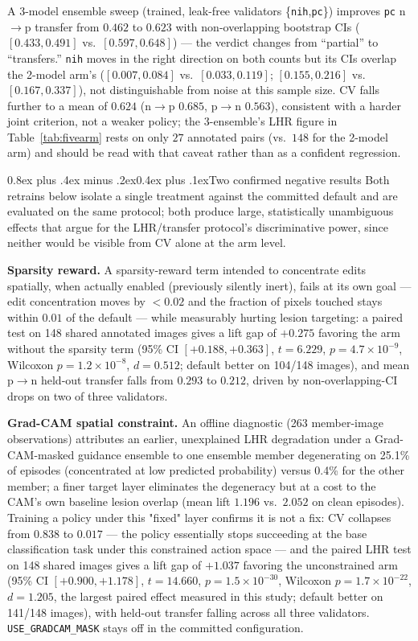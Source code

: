 \documentclass[10pt,twocolumn]{article}
\makeatletter
\renewcommand\subsection{\@startsection{subsection}{2}{\z@}%
  {0.8ex plus .4ex minus .2ex}{0.4ex plus .1ex}{\normalfont\normalsize\bfseries}}
\makeatother
\begin{document}
A 3-model ensemble sweep (trained, leak-free validators
\{\texttt{nih},\texttt{pc}\}) improves \texttt{pc} n$\to$p transfer from
$0.462$ to $0.623$ with non-overlapping bootstrap CIs
($[0.433,0.491]$ vs.\ $[0.597,0.648]$) — the verdict changes from
``partial'' to ``transfers.'' \texttt{nih} moves in the right direction
on both counts but its CIs overlap the 2-model arm's
($[0.007,0.084]$ vs.\ $[0.033,0.119]$; $[0.155,0.216]$ vs.\
$[0.167,0.337]$), not distinguishable from noise at this sample size. CV
falls further to a mean of $0.624$ (n$\to$p $0.685$, p$\to$n $0.563$),
consistent with a harder joint criterion, not a weaker policy; the
3-ensemble's LHR figure in Table~\ref{tab:fivearm} rests on only $27$
annotated pairs (vs.\ $148$ for the 2-model arm) and should be read with
that caveat rather than as a confident regression.

\subsection{Two confirmed negative results}
\label{sec:negresults}
Both retrains below isolate a single treatment against the committed
default and are evaluated on the same protocol; both produce large,
statistically unambiguous effects that argue for the LHR/transfer
protocol's discriminative power, since neither would be visible from CV
alone at the arm level.

\textbf{Sparsity reward.} A sparsity-reward term intended to concentrate
edits spatially, when actually enabled (previously silently inert),
fails at its own goal — edit concentration moves by $<0.02$ and the
fraction of pixels touched stays within $0.01$ of the default — while
measurably hurting lesion targeting: a paired test on 148 shared
annotated images gives a lift gap of $+0.275$ favoring the arm without
the sparsity term (95\% CI $[+0.188,+0.363]$, $t=6.229$,
$p=4.7\times10^{-9}$, Wilcoxon $p=1.2\times10^{-8}$, $d=0.512$; default
better on 104/148 images), and mean p$\to$n held-out transfer falls from
$0.293$ to $0.212$, driven by non-overlapping-CI drops on two of three
validators.

\textbf{Grad-CAM spatial constraint.} An offline diagnostic (263
member-image observations) attributes an earlier, unexplained LHR
degradation under a Grad-CAM-masked guidance ensemble to one ensemble
member degenerating on 25.1\% of episodes (concentrated at low predicted
probability) versus 0.4\% for the other member; a finer target layer
eliminates the degeneracy but at a cost to the CAM's own baseline lesion
overlap (mean lift $1.196$ vs.\ $2.052$ on clean episodes). Training a
policy under this "fixed" layer confirms it is not a fix: CV collapses
from $0.838$ to $0.017$ — the policy essentially stops succeeding at the
base classification task under this constrained action space — and the
paired LHR test on 148 shared images gives a lift gap of $+1.037$
favoring the unconstrained arm (95\% CI $[+0.900,+1.178]$, $t=14.660$,
$p=1.5\times10^{-30}$, Wilcoxon $p=1.7\times10^{-22}$, $d=1.205$, the
largest paired effect measured in this study; default better on 141/148
images), with held-out transfer falling across all three validators.
\texttt{USE\_GRADCAM\_MASK} stays off in the committed configuration.
\end{document}
